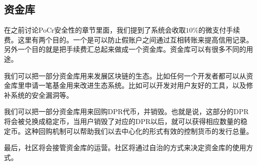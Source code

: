 \documentclass[a4paper]{article}
\begin{document}
\subsection{资金库}
在之前讨论PoCr安全性的章节里面，我们提到了系统会收取$10\%$的微支付手续费。这里有两个目的。一个是可以防止假账户之间通过互相转账来提高信用记录。另外一个目的就是把手续费汇总起来做成一个资金库。资金库可以有很多不同的用途。

我们可以把一部分资金库用来发展区块链的生态。比如任何一个开发者都可以从资金库里申请一笔基金用来改进生态系统。比如可以开发对用户友好的工具，以及修补系统的安全漏洞等。

我们可以把一部分资金库用来回购DPR代币，并销毁。也就是说，这部分的DPR将会被兑换成稳定币，当用户销毁了对应的DPR以后，就可以获得相应数量的稳定币。这种回购机制可以帮助我们以去中心化的形式有效的控制货币的发行总量。

最后，社区将会接管资金库的运营。社区将通过自治的方式来决定资金库的使用方式。





\end{document}
